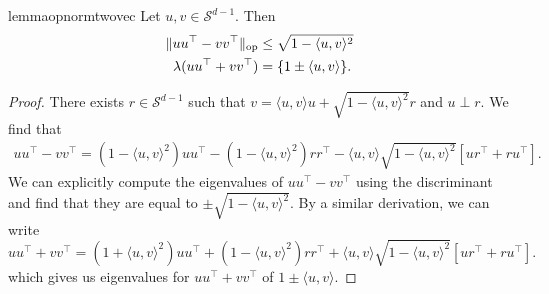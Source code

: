 \begin{restatable}{lemma}{opnormtwovec}\label{lem:opnormtwovec}
Let $u,v \in \mathcal{S}^{d-1}$. Then
\begin{align*}
\|uu^\top - vv^\top\|_{\rm op} &\leq \sqrt{1-\langle u,v\rangle^2}\\ 
\lambda(uu^\top + vv^\top) &= \{1\pm \langle u,v \rangle \}.
\end{align*}
\end{restatable}
\begin{proof}
There exists $r \in \mathcal{S}^{d-1}$ such that $v = \langle u,v\rangle u + \sqrt{1-\langle u,v\rangle^2} r$ and $u \perp r$. We find that 
\begin{align*}
uu^\top - vv^\top = (1-\langle u,v\rangle^2) uu^\top - (1-\langle u,v\rangle^2) rr^\top - \langle u,v\rangle \sqrt{1-\langle u,v\rangle^2}[ur^\top+ru^\top].
\end{align*}
We can explicitly compute the eigenvalues of $uu^\top - vv^\top$ using the discriminant and find that they are equal to $\pm \sqrt{1-\langle u,v\rangle^2}.$
By a similar derivation, we can write $$uu^\top +vv^\top = (1+\langle u,v\rangle^2) uu^\top + (1-\langle u,v\rangle^2) rr^\top+\langle u,v\rangle \sqrt{1-\langle u,v\rangle^2}[ur^\top+ru^\top].$$  
which gives us eigenvalues for $uu^\top+vv^\top$ of  $1\pm \langle u,v \rangle $.
\end{proof}

